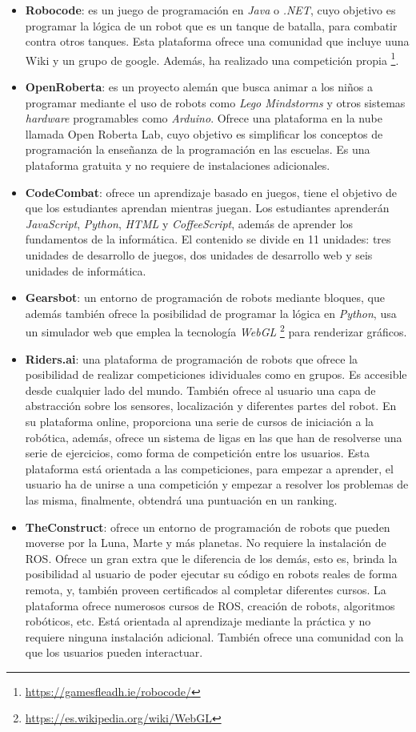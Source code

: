 \documentclass[a4paper, 12pt]{book}
\begin{document}
\begin{itemize}
\item \textbf{Robocode}: es un juego de programación en \emph{Java} o \emph{.NET}, cuyo objetivo es programar la lógica de un robot que es un tanque de batalla, para combatir contra otros tanques. Esta plataforma ofrece una comunidad que incluye uuna Wiki y un grupo de google. Además, ha realizado una competición propia \footnote{\url{https://gamesfleadh.ie/robocode/}}.
\item \textbf{OpenRoberta}: es un proyecto alemán que busca animar a los niños a programar mediante el uso de robots como \emph{Lego Mindstorms} y otros sistemas \emph{hardware} programables como \emph{Arduino}. Ofrece una plataforma en la nube llamada Open Roberta Lab, cuyo objetivo es simplificar los conceptos de programación la enseñanza de la programación en las escuelas. Es una plataforma gratuita y no requiere de instalaciones adicionales.
\item \textbf{CodeCombat}: ofrece un aprendizaje basado en juegos, tiene el objetivo de que los estudiantes aprendan mientras juegan. Los estudiantes aprenderán \emph{JavaScript}, \emph{Python}, \emph{HTML} y \emph{CoffeeScript}, además de aprender los fundamentos de la informática. El contenido se divide en 11 unidades: tres unidades de desarrollo de juegos, dos unidades de desarrollo web y seis unidades de informática.
\item \textbf{Gearsbot}: un entorno de programación de robots mediante bloques, que además también ofrece la posibilidad de programar la lógica en \emph{Python}, usa un simulador web que emplea la tecnología \emph{WebGL} \footnote{\url{https://es.wikipedia.org/wiki/WebGL}} para renderizar gráficos.
\item \textbf{Riders.ai}: una plataforma de programación de robots que ofrece la posibilidad de realizar competiciones idividuales como en grupos. Es accesible desde cualquier lado del mundo. También ofrece al usuario una capa de abstracción sobre los sensores, localización y diferentes partes del robot. En su plataforma online, proporciona una serie de cursos de iniciación a la robótica, además, ofrece un sistema de ligas en las que han de resolverse una serie de ejercicios, como forma de competición entre los usuarios. Esta plataforma está orientada a las competiciones, para empezar a aprender, el usuario ha de unirse a una competición y empezar a resolver los problemas de las misma, finalmente, obtendrá una puntuación en un ranking.
\item \textbf{TheConstruct}: ofrece un entorno de programación de robots que pueden moverse por la Luna, Marte y más planetas. No requiere la instalación de ROS. Ofrece un gran extra que le diferencia de los demás, esto es, brinda la posibilidad al usuario de poder ejecutar su código en robots reales de forma remota, y, también proveen certificados al completar diferentes cursos. La plataforma ofrece numerosos cursos de ROS, creación de robots, algoritmos robóticos, etc. Está orientada al aprendizaje mediante la práctica y no requiere ninguna instalación adicional. También ofrece una comunidad con la que los usuarios pueden interactuar.
\end{itemize}
\end{document}
